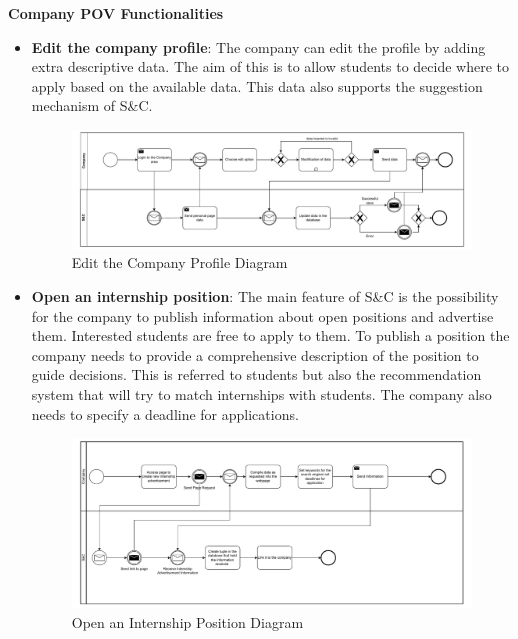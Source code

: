 \par\textbf{Company POV Functionalities}

\begin{itemize}
      \item \textbf{Edit the company profile}: The company can edit the profile by adding extra descriptive data. The
            aim of this is to allow students to decide where to apply based on the available data. This data also
            supports the suggestion mechanism of S\&C.

            \begin{figure}[H]
                  \centering
                  \includegraphics[width=1.0\textwidth]{Images/BPMN_8.pdf}
                  \caption{Edit the Company Profile Diagram}
                  \label{fig:edit_the_company_profile_diagram}
            \end{figure}

      \item \textbf{Open an internship position}: The main feature of S\&C is the possibility for the company to
            publish information about open positions and advertise them. Interested students are free to apply to them.
            To publish a position the company needs to provide a comprehensive description of the position to guide
            decisions. This is referred to students but also the recommendation system that will try to match
            internships with students. The company also needs to specify a deadline for applications.

            \begin{figure}[H]
                  \centering
                  \includegraphics[width=1.0\textwidth]{Images/BPMN_9.pdf}
                  \caption{Open an Internship Position Diagram}
                  \label{fig:open_an_internship_position_diagram}
            \end{figure}


\end{itemize}
